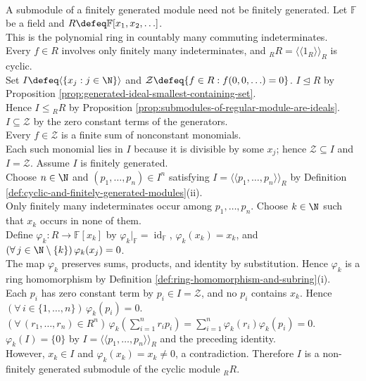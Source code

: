 \begin{counterexample} \label{cex:finitely-generated-module-with-non-fg-submodule} \\
A submodule of a finitely generated module need not be finitely generated. Let $\mathbb{F}$ be a field and $R\defeq\mathbb{F}[x_1,x_2,\ldots]$.\\
This is the polynomial ring in countably many commuting indeterminates.\\
Every $f\in R$ involves only finitely many indeterminates, and ${}_R R=\langle\!\langle1_R\rangle\!\rangle_R$ is cyclic.\\
Set $I\defeq\langle\{x_j:j\in\N\}\rangle$ and $\mathcal{Z}\defeq\{f\in R:f(0,0,\ldots)=0\}$. $I\trianglelefteq R$ by Proposition \ref{prop:generated-ideal-smallest-containing-set}.\\
Hence $I\leq{}_R R$ by Proposition \ref{prop:submodules-of-regular-module-are-ideals}. $I\subseteq\mathcal{Z}$ by the zero constant terms of the generators.\\
Every $f\in\mathcal{Z}$ is a finite sum of nonconstant monomials.\\
Each such monomial lies in $I$ because it is divisible by some $x_j$; hence $\mathcal{Z}\subseteq I$ and $I=\mathcal{Z}$. Assume $I$ is finitely generated.\\
Choose $n\in\N$ and $(p_1,\ldots,p_n)\in I^n$ satisfying $I=\langle\!\langle p_1,\ldots,p_n\rangle\!\rangle_R$ by Definition \ref{def:cyclic-and-finitely-generated-modules}(ii).\\
Only finitely many indeterminates occur among $p_1,\ldots,p_n$. Choose $k\in\N$ such that $x_k$ occurs in none of them.\\
Define $\varphi_k:R\to\mathbb{F}[x_k]$ by $\varphi_k|_{\mathbb{F}}=\operatorname{id}_{\mathbb{F}}$, $\varphi_k(x_k)=x_k$, and $(\forall\,j\in\N\setminus\{k\})\,\varphi_k(x_j)=0$.\\
The map $\varphi_k$ preserves sums, products, and identity by substitution. Hence $\varphi_k$ is a ring homomorphism by Definition \ref{def:ring-homomorphism-and-subring}(i).\\
Each $p_i$ has zero constant term by $p_i\in I=\mathcal{Z}$, and no $p_i$ contains $x_k$. Hence $(\forall\,i\in\{1,\ldots,n\})\,\varphi_k(p_i)=0$.\\
$(\forall\,(r_1,\ldots,r_n)\in R^n)\,\varphi_k\left(\sum\limits_{i=1}^{n}r_ip_i\right)=\sum\limits_{i=1}^{n}\varphi_k(r_i)\varphi_k(p_i)=0$. $\varphi_k(I)=\{0\}$ by $I=\langle\!\langle p_1,\ldots,p_n\rangle\!\rangle_R$ and the preceding identity.\\
However, $x_k\in I$ and $\varphi_k(x_k)=x_k\neq0$, a contradiction. Therefore $I$ is a non-finitely generated submodule of the cyclic module ${}_R R$.
\end{counterexample}
